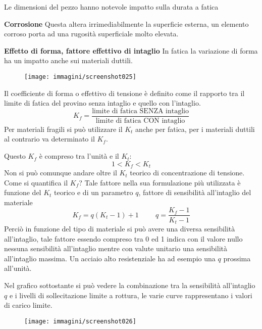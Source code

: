\documentclass{article}
\begin{document}
\begin{adjustwidth}{2in}{}
			 Le dimensioni del pezzo hanno notevole impatto sulla durata a fatica \newline
			 
			 \textbf{\Large Corrosione} \newline 
			 Questa altera irrimediabilmente la superficie esterna, un elemento corroso porta ad una rugosità superficiale molto elevata. \newpage
			 
			 \textbf{\Large Effetto di forma, fattore effettivo di intaglio} \newline
			 In fatica la variazione di forma ha un impatto anche sui materiali duttili.
			\begin{figure}[H]
				\centering
				\texttt{[image: immagini/screenshot025]}
				\label{fig:screenshot025}
			\end{figure}
			
			Il coefficiente di forma o effettivo di tensione è definito come il rapporto tra il limite di fatica del provino senza intaglio e quello con l'intaglio.
			\[K_f = \dfrac{\text{limite di fatica SENZA intaglio}}{\text{limite di fatica CON intaglio}}\]
			Per materiali fragili si può utilizzare il $K_t$ anche per fatica, per i materiali duttili al contrario va determinato il $K_f$.
			
			 Questo $K_f$ è compreso tra l'unità e il $K_t$:
			 \[1<K_f<K_t\]
			 Non si può comunque andare oltre il  $K_t$ teorico di concentrazione di tensione.
			 Come si quantifica il  $K_f$? Tale fattore nella sua formulazione più utilizzata è funzione del  $K_t$ teorico e di un parametro $ q $, fattore di sensibilità all'intaglio del materiale
			 \[K_f = q(K_t-1) + 1 \hspace{1cm} q = \dfrac{K_f-1}{K_t-1}\] 
			 Perciò in funzione del tipo di materiale si può avere una diversa sensibilità all'intaglio, tale fattore essendo compreso tra 0 ed 1 indica con il valore nullo nessuna sensibilità all'intaglio mentre con valute unitario una sensibilità all'intaglio massima. Un acciaio alto resistenziale ha ad esempio una $ q $ prossima all'unità. \newline
			 
			 Nel grafico sottostante si può vedere la combinazione tra la sensibilità all'intaglio $ q $ e i livelli di sollecitazione limite a rottura, le varie curve rappresentano i valori di carico limite.
			 
			 \begin{figure}[H]
			 	\centering
			 	\texttt{[image: immagini/screenshot026]}
			 	\label{fig:screenshot026}
			 \end{figure}			 
			 

\end{adjustwidth}
\end{document}
